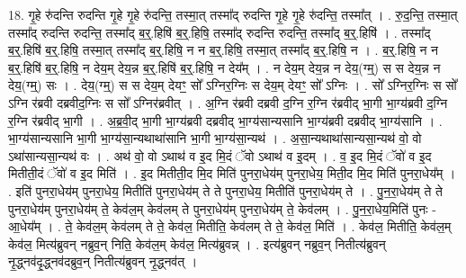 \documentclass[17pt]{extarticle}
\begin{document}
18. गृ॒हे रु॑दन्ति रुदन्ति गृ॒हे गृ॒हे रु॑दन्ति॒ तस्मा॒त् तस्मा᳚द् रुदन्ति गृ॒हे गृ॒हे रु॑दन्ति॒ तस्मा᳚त् । . रु॒द॒न्ति॒ तस्मा॒त् तस्मा᳚द् रुदन्ति रुदन्ति॒ तस्मा᳚द् ब॒र्॒.हिषि॑ ब॒र्॒.हिषि॒ तस्मा᳚द् रुदन्ति रुदन्ति॒ तस्मा᳚द् ब॒र्॒.हिषि॑ । . तस्मा᳚द् ब॒र्॒.हिषि॑ ब॒र्॒.हिषि॒ तस्मा॒त् तस्मा᳚द् ब॒र्॒.हिषि॒ न न ब॒र्॒.हिषि॒ तस्मा॒त् तस्मा᳚द् ब॒र्॒.हिषि॒ न । . ब॒र्॒.हिषि॒ न न ब॒र्॒.हिषि॑ ब॒र्॒.हिषि॒ न देय॒म् देय॒न्न ब॒र्॒.हिषि॑ ब॒र्॒.हिषि॒ न देय᳚म् । . न देय॒म् देय॒न्न न देय॒(ग्म्॒) स स देय॒न्न न देय॒(ग्म्॒) सः । . देय॒(ग्म्॒) स स देय॒म् देयꣳ॒॒ सो᳚ ऽग्निर॒ग्निः स देय॒म् देयꣳ॒॒ सो᳚ ऽग्निः । . सो᳚ ऽग्निर॒ग्निः स सो᳚ ऽग्नि र॑ब्रवी दब्रवीद॒ग्निः स सो᳚ ऽग्निर॑ब्रवीत् । . अ॒ग्नि र॑ब्रवी दब्रवी द॒ग्नि र॒ग्नि र॑ब्रवीद् भा॒गी भा॒ग्य॑ब्रवी द॒ग्नि र॒ग्नि र॑ब्रवीद् भा॒गी । . अ॒ब्र॒वी॒द् भा॒गी भा॒ग्य॑ब्रवी दब्रवीद् भा॒ग्य॑सान्यसानि भा॒ग्य॑ब्रवी दब्रवीद् भा॒ग्य॑सानि । . भा॒ग्य॑सान्यसानि भा॒गी भा॒ग्य॑सा॒न्यथाथा॑सानि भा॒गी भा॒ग्य॑सा॒न्यथ॑ । . अ॒सा॒न्यथाथा॑सान्यसा॒न्यथ॑ वो॒ वो ऽथा॑सान्यसा॒न्यथ॑ वः । . अथ॑ वो॒ वो ऽथाथ॑ व इ॒द मि॒दं ॅवो ऽथाथ॑ व इ॒दम् । . व॒ इ॒द मि॒दं ॅवो॑ व इ॒द मितीती॒दं ॅवो॑ व इ॒द मिति॑ । . इ॒द मितीती॒द मि॒द मिति॑ पुनरा॒धेय॑म् पुनरा॒धेय॒ मिती॒द मि॒द मिति॑ पुनरा॒धेय᳚म् । . इति॑ पुनरा॒धेय॑म् पुनरा॒धेय॒ मितीति॑ पुनरा॒धेय॑म् ते ते पुनरा॒धेय॒ मितीति॑ पुनरा॒धेय॑म् ते । . पु॒न॒रा॒धेय॑म् ते ते पुनरा॒धेय॑म् पुनरा॒धेय॑म् ते॒ केव॑ल॒म् केव॑लम् ते पुनरा॒धेय॑म् पुनरा॒धेय॑म् ते॒ केव॑लम् । . पु॒न॒रा॒धेय॒मिति॑ पुनः - आ॒धेय᳚म् । . ते॒ केव॑ल॒म् केव॑लम् ते ते॒ केव॑ल॒ मितीति॒ केव॑लम् ते ते॒ केव॑ल॒ मिति॑ । . केव॑ल॒ मितीति॒ केव॑ल॒म् केव॑ल॒ मित्य॑ब्रुवन् नब्रुव॒न् निति॒ केव॑ल॒म् केव॑ल॒ मित्य॑ब्रुवन्न् । . इत्य॑ब्रुवन् नब्रुव॒न् नितीत्य॑ब्रुवन् नृ॒द्ध्नव॑दृ॒द्ध्नव॑दब्रुव॒न् नितीत्य॑ब्रुवन् नृ॒द्ध्नव॑त् । \newline
\end{document}
